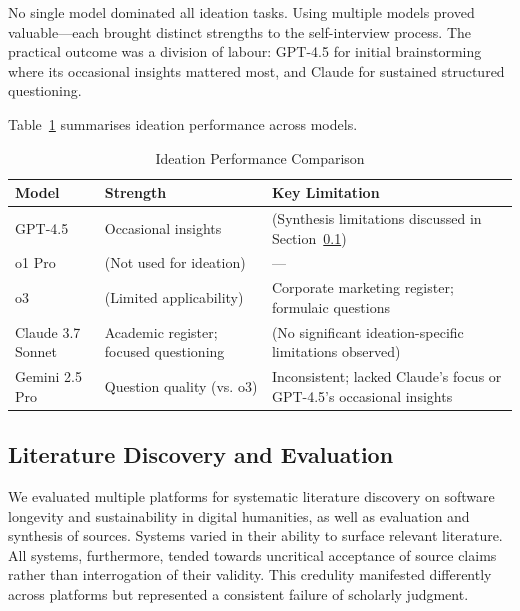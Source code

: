 No single model dominated all ideation tasks. Using multiple models proved valuable---each brought distinct strengths to the self-interview process. The practical outcome was a division of labour: GPT-4.5 for initial brainstorming where its occasional insights mattered most, and Claude for sustained structured questioning.

Table~\ref{tab:ideation-comparison} summarises ideation performance across models.

\begin{table}[h]
\centering
\caption{Ideation Performance Comparison}
\label{tab:ideation-comparison}
\begin{tabular}{p{3cm}p{4cm}p{5cm}}
\toprule
\textbf{Model} & \textbf{Strength} & \textbf{Key Limitation} \\
\midrule
GPT-4.5 & Occasional insights & (Synthesis limitations discussed in Section~\ref{sec:lit-discovery}) \\
o1 Pro & (Not used for ideation) & --- \\
o3 & (Limited applicability) & Corporate marketing register; formulaic questions \\
Claude 3.7 Sonnet & Academic register; focused questioning & (No significant ideation-specific limitations observed) \\
Gemini 2.5 Pro & Question quality (vs. o3) & Inconsistent; lacked Claude's focus or GPT-4.5's occasional insights \\
\bottomrule
\end{tabular}
\end{table}




\subsection{Literature Discovery and Evaluation}
\label{sec:lit-discovery}

We evaluated multiple platforms for systematic literature discovery on software longevity and sustainability in digital humanities, as well as evaluation and synthesis of sources. Systems varied in their ability to surface relevant literature. All systems, furthermore, tended towards uncritical acceptance of source claims rather than interrogation of their validity. This credulity manifested differently across platforms but represented a consistent failure of scholarly judgment.

